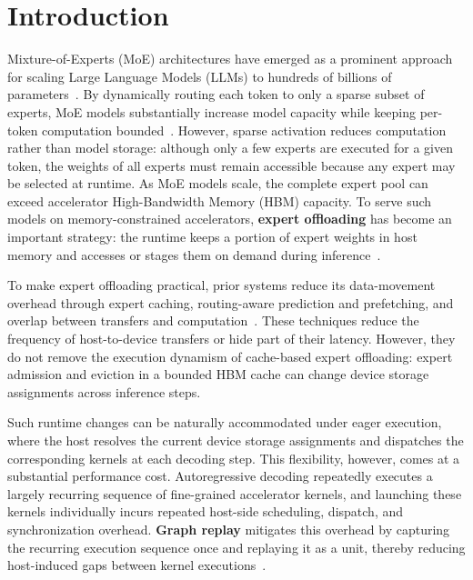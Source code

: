 \section{Introduction}
\label{sec:intro}

Mixture-of-Experts (MoE) architectures have emerged as a prominent approach for scaling Large Language Models (LLMs) to hundreds of billions of parameters~\cite{shazeer2017outrageously,fedus2022switch, jiang2024mixtral,dai2024deepseekmoe}. 
By dynamically routing each token to only a sparse subset of experts, MoE models substantially increase model capacity while keeping per-token computation bounded~\cite{du2022glam,rajbhandari2022deepspeedmoe}. 
However, sparse activation reduces computation rather than model storage: although only a few experts are executed for a given token, the weights of all experts must remain accessible because any expert may be selected at runtime.
As MoE models scale, the complete expert pool can exceed accelerator High-Bandwidth Memory (HBM) capacity.
To serve such models on memory-constrained accelerators, \textbf{expert offloading} has become an important strategy: the runtime keeps a portion of expert weights in host memory and accesses or stages them on demand during inference~\cite{hwang2024pregated,xue2024moeinfinity,li2026commitmoe}. 

To make expert offloading practical, prior systems reduce its data-movement overhead through expert caching, routing-aware prediction and prefetching, and overlap between transfers and computation~\cite{hwang2024pregated,kong2024swapmoe,cao2025moelightning,fang2025klotski,xue2024moeinfinity}. 
These techniques reduce the frequency of host-to-device transfers or hide part of their latency.
However, they do not remove the execution dynamism of cache-based expert offloading: expert admission and eviction in a bounded HBM cache can change device storage assignments across inference steps.

Such runtime changes can be naturally accommodated under eager execution, where the host resolves the current device storage assignments and dispatches the corresponding kernels at each decoding step.
This flexibility, however, comes at a substantial performance cost.
Autoregressive decoding repeatedly executes a largely recurring sequence of fine-grained accelerator kernels, and launching these kernels individually incurs repeated host-side scheduling, dispatch, and synchronization overhead.
\textbf{Graph replay} mitigates this overhead by capturing the recurring execution sequence once and replaying it as a unit, thereby reducing host-induced gaps between kernel executions~\cite{kwon2020nimble,ye2025flashinfer}.

